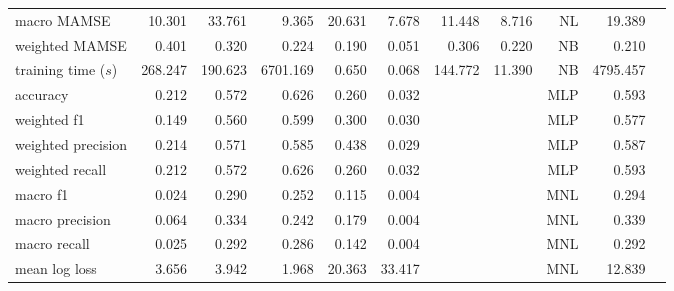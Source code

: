 \documentclass[numbered]{trbunofficial}
\begin{document}
{\begin{landscape}
\begin{table}[t]
\begin{center}
\begin{tabular}{l|rrrrrrr|r|r|r}
macro MAMSE                      &         10.301 &               33.761 &                  9.365 &       20.631 &             7.678 &          11.448 &                 8.716 & NL &        19.389 &\\
weighted MAMSE                     &          0.401 &                0.320 &                 0.224 &        0.190 &             0.051 &           0.306 &                 0.220 & NB &         0.210 &\\
training time ($s$)                           &       268.247 &      190.623 &             6701.169 &        0.650 &         0.068 &         144.772 &         11.390 &  NB&     4795.457& \\

\hline
accuracy                                  &          0.212 &                0.572 &                                          0.626 &        0.260 &             0.032 &&&   MLP&      0.593 & \parbox[t]{2mm}{}\\
weighted f1                               &          0.149 &                0.560 &                                          0.599 &        0.300 &             0.030 &&&   MLP&       0.577 &\\
weighted precision                        &          0.214 &                0.571 &                                          0.585 &        0.438 &             0.029 &&&   MLP&       0.587& \\
weighted recall                           &          0.212 &                0.572 &                                          0.626 &        0.260 &             0.032 &&&  MLP&        0.593& \\
macro f1                                  &          0.024 &                0.290 &                                          0.252 &        0.115 &             0.004 &&&    MNL&      0.294& \\
macro precision                           &          0.064 &                0.334 &                                          0.242 &        0.179 &             0.004 &&&   MNL&       0.339& \\
macro recall                              &          0.025 &                0.292 &                                          0.286 &        0.142 &             0.004 &&&   MNL&       0.292& \\
mean log loss                           &          3.656 &                3.942 &                                          1.968 &       20.363 &            33.417 &&&   MNL&      12.839& \\

\end{tabular}
\end{center}
\end{table}
\end{landscape}}
\end{document}
